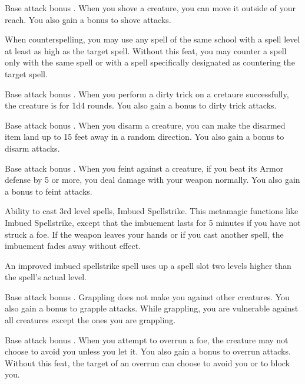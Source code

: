  Base attack bonus .
 When you shove a creature, you can move it outside of your reach. You also gain a  bonus to shove attacks.

 When counterspelling, you may use any spell of the same school with a spell level at least as high as the target spell.
 Without this feat, you may counter a spell only with the same spell or with a spell specifically designated as countering the target spell.

 Base attack bonus .
 When you perform a dirty trick on a cretaure successfully, the creature is \vulnerable for 1d4 rounds. You also gain a  bonus to dirty trick attacks.

 Base attack bonus .
 When you disarm a creature, you can make the disarmed item land up to 15 feet away in a random direction. You also gain a  bonus to disarm attacks.

 Base attack bonus .
 When you feint against a creature, if you beat its Armor defense by 5 or more, you deal damage with your weapon normally. You also gain a  bonus to feint attacks.

 Ability to cast 3rd level spells, Imbued Spellstrike.
 This metamagic functions like Imbued Spellstrike, except that the imbuement lasts for 5 minutes if you have not struck a foe. If the weapon leaves your hands or if you cast another spell, the imbuement fades away without effect.

An improved imbued spellstrike spell uses up a spell slot two levels higher than the spell's actual level.

 Base attack bonus .
 Grappling does not make you \vulnerable against other creatures. You also gain a  bonus to grapple attacks.
 While grappling, you are vulnerable against all creatures except the ones you are grappling.

 Base attack bonus .
 When you attempt to overrun a foe, the creature may not choose to avoid you unless you let it. You also gain a  bonus to overrun attacks.
 Without this feat, the target of an overrun can choose to avoid you or to block you.

